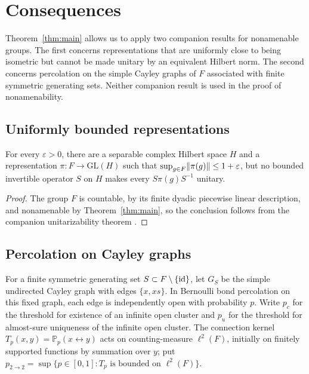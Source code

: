 \section{Consequences}\label{sec:consequences}

Theorem~\ref{thm:main} allows us to apply two companion results for
nonamenable groups. The first concerns representations that are uniformly
close to being isometric but cannot be made unitary by an equivalent
Hilbert norm. The second concerns percolation on the simple Cayley graphs of \(F\)
associated with finite symmetric generating sets.
Neither companion result is used in the proof of nonamenability.

\subsection{Uniformly bounded representations}

\begin{corollary}\label{cor:nonunitarizable}
For every \(\varepsilon>0\), there are a separable complex Hilbert space
\(H\) and a representation \(\pi:F\to\mathrm{GL}(H)\) such that
\(\sup_{g\in F}\lVert \pi(g)\rVert\le1+\varepsilon\), but no bounded invertible
operator \(S\) on \(H\) makes every \(S\pi(g)S^{-1}\) unitary.
\end{corollary}

\begin{proof}
The group \(F\) is countable, by its finite dyadic piecewise linear
description, and nonamenable by Theorem~\ref{thm:main}, so the conclusion
follows from the companion unitarizability theorem
\cite[Theorem~1.1]{OpenAIUnitarizability2026}.
\end{proof}

\subsection{Percolation on Cayley graphs}

For a finite symmetric generating set \(S\subset F\setminus\{\mathrm{id}\}\), let
\(G_S\) be the simple undirected Cayley graph with edges \(\{x,xs\}\).
In Bernoulli bond percolation on this fixed graph, each edge is independently
open with probability \(p\). Write \(p_c\) for the threshold for existence
of an infinite open cluster and \(p_u\) for the threshold for almost-sure
uniqueness of the infinite open cluster. The connection kernel
\(T_p(x,y)=\mathbb P_p(x\leftrightarrow y)\) acts on counting-measure
\(\ell^2(F)\), initially on finitely supported functions by summation over
\(y\); put \(p_{2\to2}=\sup\{p\in[0,1]:T_p\text{ is bounded on }\ell^2(F)\}\).

